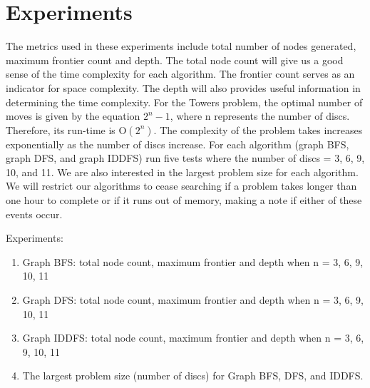\documentclass[11pt]{article}
\begin{document}
\section{Experiments}

The metrics used in these experiments include total number of nodes generated, maximum frontier count and depth. The total node count will give us a good sense of the time complexity for each algorithm. The frontier count serves as an indicator for space complexity. The depth will also provides useful information in determining the time complexity. For the Towers problem, the optimal number of moves is given by the equation \begin{math} 2^n - 1\end{math}, where n represents the number of discs. Therefore, its run-time is O\begin{math}(2^n) \end{math}. The complexity of the problem takes increases exponentially as the number of discs increase. For each algorithm (graph BFS, graph DFS, and graph IDDFS) run five tests where the number of discs = 3, 6, 9, 10, and 11. We are also interested in the largest problem size for each algorithm. We will restrict our algorithms to cease searching if a problem takes longer than one hour to complete or if it runs out of memory, making a note if either of these events occur.

Experiments:
\begin{enumerate}
\item Graph BFS: total node count, maximum frontier and depth when n = 3, 6, 9, 10, 11
\item Graph DFS: total node count, maximum frontier and depth when n = 3, 6, 9, 10, 11
\item Graph IDDFS: total node count, maximum frontier and depth when n = 3, 6, 9, 10, 11
\item The largest problem size (number of discs) for Graph BFS, DFS, and IDDFS.
\end{enumerate}
\end{document}
